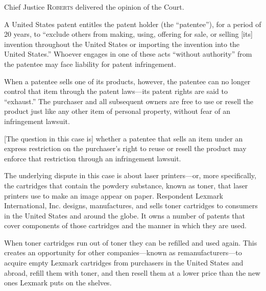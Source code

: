 

\opinion Chief Justice \textsc{Roberts} delivered the opinion of the Court.

A United States patent entitles the patent holder (the ``patentee''), for a
period of 20 years, to ``exclude others from making, using, offering for sale,
or selling [its] invention throughout the United States or importing the
invention into the United States.'' Whoever engages in one
of these acts ``without authority'' from the patentee may face liability for
patent infringement.

When a patentee sells one of its products, however, the patentee can no longer
control that item through the patent laws---its patent rights are said to
``exhaust.'' The purchaser and all subsequent owners are free to use or resell
the product just like any other item of personal property, without fear of an
infringement lawsuit.

[The question in this case is]
whether a patentee that sells an item under an express
restriction on the purchaser's right to reuse or resell the product may enforce
that restriction through an infringement lawsuit.




The underlying dispute in this case is about laser printers---or, more
specifically, the cartridges that contain the powdery substance, known as toner,
that laser printers use to make an image appear on paper. Respondent Lexmark
International, Inc. designs, manufactures, and sells toner cartridges to
consumers in the United States and around the globe. It owns a number of patents
that cover components of those cartridges and the manner in which they are used.

When toner cartridges run out of toner they can be refilled and used again. This
creates an opportunity for other companies---known as remanufacturers---to
acquire empty Lexmark cartridges from purchasers in the United States and
abroad, refill them with toner, and then resell them at a lower price than the
new ones Lexmark puts on the shelves.

